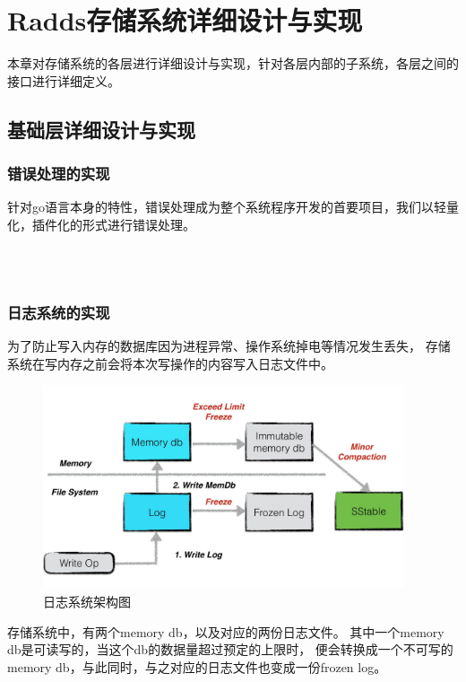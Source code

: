 \section{Radds存储系统详细设计与实现}

	本章对存储系统的各层进行详细设计与实现，针对各层内部的子系统，各层之间的接口进行详细定义。

	\subsection{基础层详细设计与实现}
	
   		\subsubsection{错误处理的实现}

		针对go语言本身的特性，错误处理成为整个系统程序开发的首要项目，我们以轻量化，插件化的形式进行错误处理。
	
		\begin{lstlisting}[caption=Errors , label=code_radds_errors]

 
		\end{lstlisting}                 

	
			
   		\subsubsection{日志系统的实现}
    
	   	为了防止写入内存的数据库因为进程异常、操作系统掉电等情况发生丢失，
	   	存储系统在写内存之前会将本次写操作的内容写入日志文件中。
    
    	\begin{figure}[H]
    		\centering
    		\includegraphics[width=0.95\textwidth]{images/two_log}
    		\caption{日志系统架构图}
    		\label{two_log}
    	\end{figure}
		存储系统中，有两个memory db，以及对应的两份日志文件。
		其中一个memory db是可读写的，当这个db的数据量超过预定的上限时，
		便会转换成一个不可写的memory db，与此同时，与之对应的日志文件也变成一份frozen log。

